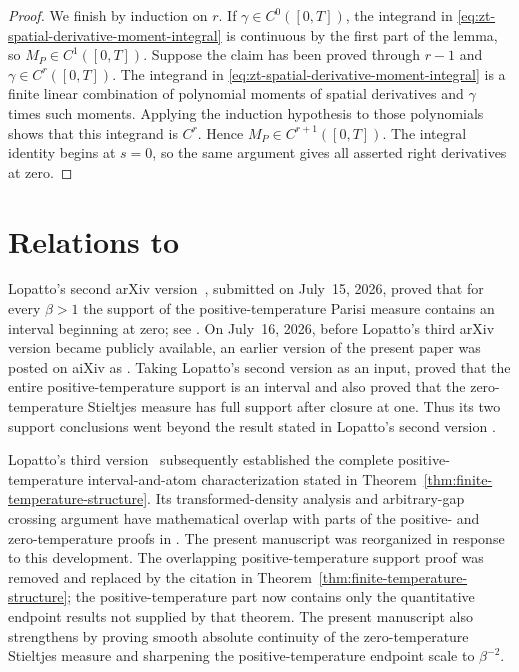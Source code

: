 \documentclass[10pt]{amsart}
\theoremstyle{definition}
\theoremstyle{remark}
\numberwithin{equation}{section}
\newcommand{\1}{\mathbf 1}
\begin{document}
\begin{proof}
We finish by induction on $r$.  If $\gamma\in C^0([0,T])$, the integrand in \eqref{eq:zt-spatial-derivative-moment-integral} is continuous by the first part of the lemma, so $M_P\in C^1([0,T])$.  Suppose the claim has been proved through $r-1$ and $\gamma\in C^r([0,T])$.  The integrand in \eqref{eq:zt-spatial-derivative-moment-integral} is a finite linear combination of polynomial moments of spatial derivatives and $\gamma$ times such moments.  Applying the induction hypothesis to those polynomials shows that this integrand is $C^r$.  Hence $M_P\in C^{r+1}([0,T])$.  The integral identity begins at $s=0$, so the same argument gives all asserted right derivatives at zero.
\end{proof}
\fi

\section{\texorpdfstring{Relations to \cite{AIxivPreprint,Lopatto2026v2,Lopatto2026}}{Relations to the aiXiv preprint and Lopatto's second and third versions}}
\label{app:development}

Lopatto's second arXiv version~\cite{Lopatto2026v2}, submitted on July~15, 2026, proved that for every $\beta>1$ the support of the positive-temperature Parisi measure contains an interval beginning at zero; see \cite[Theorem~1.1]{Lopatto2026v2}. On July~16, 2026, before Lopatto's third arXiv version \cite{Lopatto2026} became publicly available, an earlier version of the present paper was posted on aiXiv as \cite{AIxivPreprint}. Taking Lopatto's second version \cite{Lopatto2026v2} as an input, \cite{AIxivPreprint} proved that the entire positive-temperature support is an interval and also proved that the zero-temperature Stieltjes measure has full support after closure at one. Thus its two support conclusions went beyond the result stated in Lopatto's second version \cite{Lopatto2026v2}.

Lopatto's third version~\cite{Lopatto2026} subsequently established the complete positive-temperature interval-and-atom characterization stated in Theorem~\ref{thm:finite-temperature-structure}. Its transformed-density analysis and arbitrary-gap crossing argument have mathematical overlap with parts of the positive- and zero-temperature proofs in \cite{AIxivPreprint}. The present manuscript was reorganized in response to this development. The overlapping positive-temperature support proof was removed and replaced by the citation in Theorem~\ref{thm:finite-temperature-structure}; the positive-temperature part now contains only the quantitative endpoint results not supplied by that theorem. The present manuscript also strengthens \cite{AIxivPreprint} by proving smooth absolute continuity of the zero-temperature Stieltjes measure and sharpening the positive-temperature endpoint scale to $\beta^{-2}$.
\end{document}
